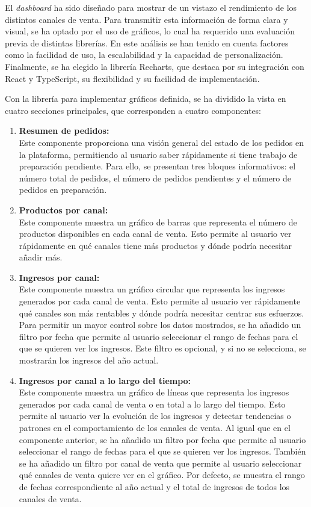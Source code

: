 El \textit{dashboard} ha sido diseñado para mostrar de un vistazo el rendimiento de los distintos canales de venta. Para transmitir esta información de forma clara y visual, se ha optado por el uso de gráficos, lo cual ha requerido una evaluación previa de distintas librerías. En este análisis se han tenido en cuenta factores como la facilidad de uso, la escalabilidad y la capacidad de personalización. Finalmente, se ha elegido la librería Recharts, que destaca por su integración con React y TypeScript, su flexibilidad y su facilidad de implementación.

Con la librería para implementar gráficos definida, se ha dividido la vista en cuatro secciones principales, que corresponden a cuatro componentes:

\begin{enumerate}
    \item \textbf{Resumen de pedidos:} \\
          Este componente proporciona una visión general del estado de los pedidos en la plataforma, permitiendo al usuario saber rápidamente si tiene trabajo de preparación pendiente. Para ello, se presentan tres bloques informativos: el número total de pedidos, el número de pedidos pendientes y el número de pedidos en preparación.
    \item \textbf{Productos por canal:} \\
          Este componente muestra un gráfico de barras que representa el número de productos disponibles en cada canal de venta. Esto permite al usuario ver rápidamente en qué canales tiene más productos y dónde podría necesitar añadir más.
    \item \textbf{Ingresos por canal:} \\
          Este componente muestra un gráfico circular que representa los ingresos generados por cada canal de venta. Esto permite al usuario ver rápidamente qué canales son más rentables y dónde podría necesitar centrar sus esfuerzos. Para permitir un mayor control sobre los datos mostrados, se ha añadido un filtro por fecha que permite al usuario seleccionar el rango de fechas para el que se quieren ver los ingresos. Este filtro es opcional, y si no se selecciona, se mostrarán los ingresos del año actual.
    \item \textbf{Ingresos por canal a lo largo del tiempo:} \\
          Este componente muestra un gráfico de líneas que representa los ingresos generados por cada canal de venta o en total a lo largo del tiempo. Esto permite al usuario ver la evolución de los ingresos y detectar tendencias o patrones en el comportamiento de los canales de venta. Al igual que en el componente anterior, se ha añadido un filtro por fecha que permite al usuario seleccionar el rango de fechas para el que se quieren ver los ingresos. También se ha añadido un filtro por canal de venta que permite al usuario seleccionar qué canales de venta quiere ver en el gráfico. Por defecto, se muestra el rango de fechas correspondiente al año actual y el total de ingresos de todos los canales de venta.
\end{enumerate}


